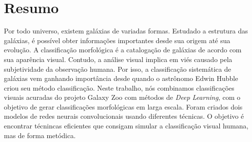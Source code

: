 \section*{Resumo}
 
Por todo universo, existem galáxias de variadas formas. Estudado a estrutura das galáxias, é possível obter informações importantes desde  sua origem até sua evolução. A classificação morfológica é a catalogação de galáxias de acordo com sua aparência visual. Contudo, a análise visual implica em viés causado pela subjetividade da observação humana. Por isso, a classificação sistemática de galáxias vem ganhando importância desde quando o astrônomo Edwin Hubble criou seu método classificação. Neste trabalho, nós combinamos classificações visuais acuradas do projeto Galaxy Zoo com métodos de \emph{Deep Learning}, com o objetivo de gerar classificações morfológicas em larga escala. Foram criados dois modelos de redes neurais convolucionais usando diferentes técnicas. O objetivo é encontrar técnincas eficientes que consigam simular a classificação visual humana, mas de forma metódica.